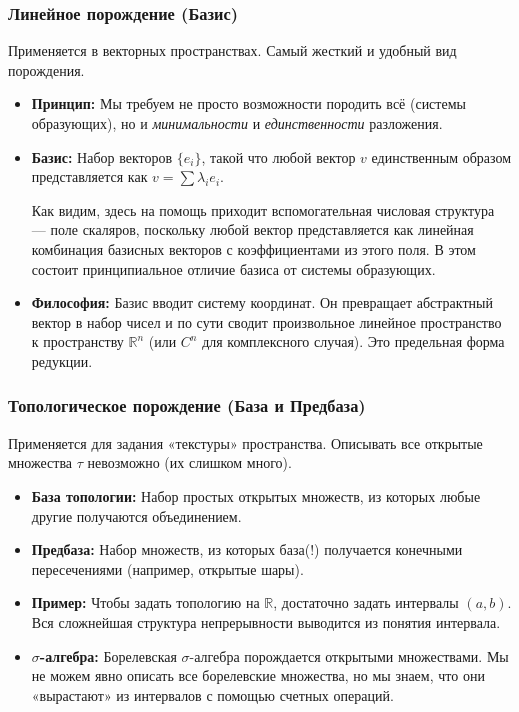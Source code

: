 \documentclass[11pt, a4paper]{extarticle}
\newcommand{\R}{{\mathbb R}}
\begin{document}
\subsubsection{Линейное порождение (Базис)}
Применяется в векторных пространствах. Самый жесткий и удобный вид порождения.
\begin{itemize}
    \item \textbf{Принцип:} Мы требуем не просто возможности породить всё (системы образующих), но и \textit{минимальности} и \textit{единственности} разложения. 
    \item \textbf{Базис:} Набор векторов $\{e_i\}$, такой что любой вектор $v$ единственным образом представляется как $v = \sum \lambda_i e_i$. 
    
    Как видим, здесь на помощь приходит вспомогательная числовая структура --- поле скаляров, поскольку любой вектор представляется как линейная комбинация базисных векторов с коэффициентами из этого поля. В этом состоит принципиальное отличие базиса от системы образующих.
    \item \textbf{Философия:} Базис вводит систему координат. Он превращает абстрактный вектор в набор чисел и по сути сводит произвольное линейное пространство к пространству $\R^n$ (или $C^n$ для комплексного случая). Это предельная форма редукции.
\end{itemize}

\subsubsection{Топологическое порождение (База и Предбаза)}
Применяется для задания «текстуры» пространства. Описывать все открытые множества $\tau$ невозможно (их слишком много).
\begin{itemize}
    \item \textbf{База топологии:} Набор простых открытых множеств, из которых любые другие получаются объединением.
    \item \textbf{Предбаза:} Набор множеств, из которых база(!) получается конечными пересечениями (например, открытые шары).
    \item \textbf{Пример:} Чтобы задать топологию на $\R$, достаточно задать интервалы $(a, b)$. Вся сложнейшая структура непрерывности выводится из понятия интервала.
    \item \textbf{$\sigma$-алгебра:} Борелевская $\sigma$-алгебра порождается открытыми множествами. Мы не можем явно описать все борелевские множества, но мы знаем, что они «вырастают» из интервалов с помощью счетных операций.
\end{itemize}
\end{document}
